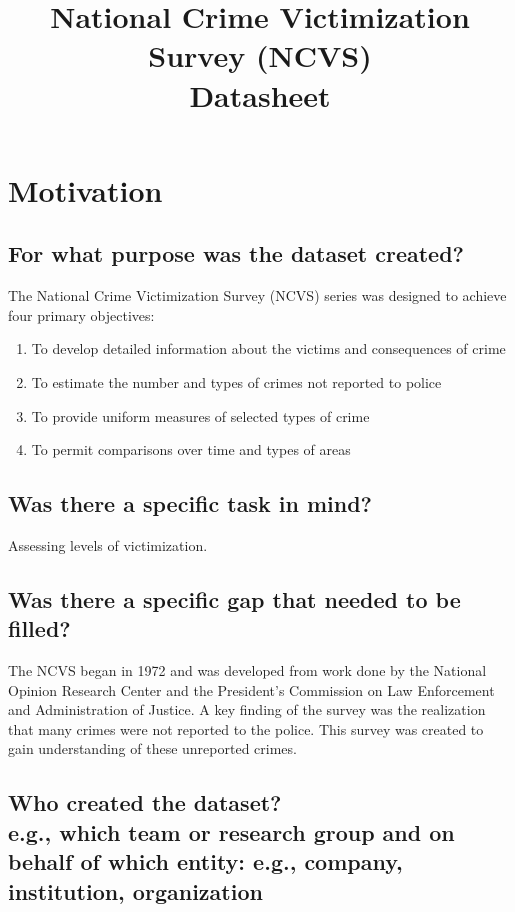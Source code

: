 \documentclass[letterpaper, 10 pt, conference]{ieeeconf}  %
\title{\LARGE \bf
National Crime Victimization Survey (NCVS) \\{\color{blue}Datasheet}
}
\newcommand{\subtitle}[1]{{\\ \small \normalfont \color{purple} #1}}
\begin{document}
\maketitle
\thispagestyle{empty}
\pagestyle{empty}

\section{Motivation}

\subsection{For what purpose was the dataset created?}

The National Crime Victimization Survey (NCVS) series was designed to achieve four primary objectives:
\begin{enumerate}
    \item To develop detailed information about the victims and consequences of crime
    \item To estimate the number and types of crimes not reported to police
    \item To provide uniform measures of selected types of crime
    \item To permit comparisons over time and types of areas
\end{enumerate}

\subsection{Was there a specific task in mind?}

Assessing levels of victimization.

\subsection{Was there a specific gap that needed to be filled?}

The NCVS began in 1972 and was developed from work done by the National Opinion Research Center and the President's Commission on Law Enforcement and Administration of Justice. A key finding of the survey was the realization that many crimes were not reported to the police. This survey was created to gain understanding of these unreported crimes.

\subsection{Who created the dataset? \subtitle{e.g., which team or research group and on behalf of which entity: e.g., company, institution, organization}}
\end{document}
